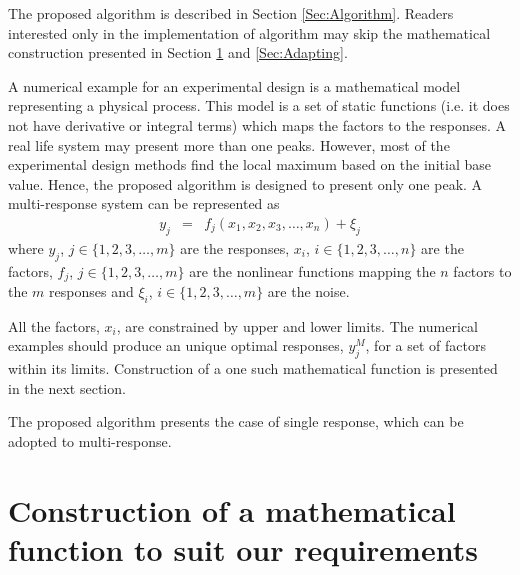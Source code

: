 \documentclass[twocolumn]{svjour3}          %
\begin{document}
\par
The proposed algorithm is described in Section \ref{Sec:Algorithm}. Readers interested only in the implementation of algorithm may skip the mathematical construction presented in Section \ref{Sec:Construction} and \ref{Sec:Adapting}.
\par
A numerical example for an experimental design is a mathematical model representing a physical process. This model is a set of static functions (i.e. it does not have derivative or integral terms) which maps the factors to the responses. A real life system may present more than one peaks. However, most of the experimental design methods find the local maximum based on the initial base value. Hence, the proposed algorithm is designed to present only one peak. A multi-response system can be represented as %
\begin{eqnarray}
y_j &=& f_j(x_1, x_2, x_3, \dots, x_n) + \xi_j \label{Eqn:Function}
\end{eqnarray}
\noindent where $y_j$, $j\in \{1,2,3, \dots, m\}$ are the responses, $x_i$, $i\in \{1,2,3, \dots, n\}$ are the factors, $f_j$, $j\in \{1,2,3, \dots, m\}$ are the nonlinear functions mapping the $n$ factors to the $m$ responses and $\xi_i$, $i\in \{1,2,3, \dots, m\}$ are the noise.
\par
All the factors, $x_i$, are constrained by upper and lower limits. The numerical examples should produce an unique optimal responses, $y_j^M$, for a set of factors within its limits. Construction of a one such mathematical function is presented in the next section.
\par
The proposed algorithm presents the case of single response, which can be adopted to multi-response.
\section{Construction of a mathematical function to suit our requirements}
\label{Sec:Construction}
\end{document}
